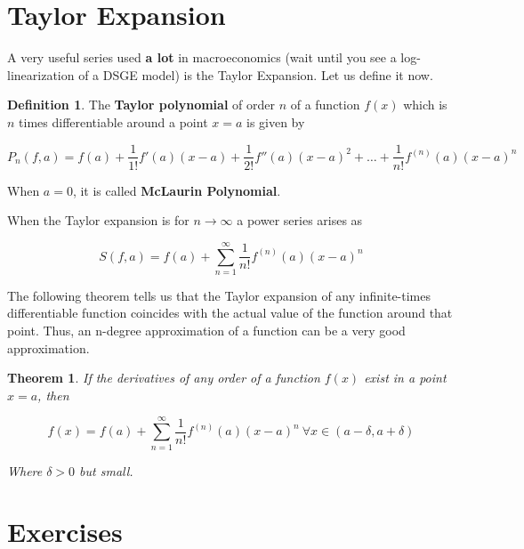 \documentclass[a4paper,11pt]{article}
\theoremstyle{definition}
\newtheorem{definition}{Definition}
\theoremstyle{plain}
\newtheorem{theorem}{Theorem}
\begin{document}
\section{Taylor Expansion}\label{taylor-expansion}

A very useful series used \textbf{a lot} in macroeconomics (wait until you see a log-linearization of a DSGE model) is the Taylor Expansion. Let us define it now.

\begin{definition}
The \textbf{Taylor polynomial} of order \(n\) of a function \(f(x)\) which is \(n\) times differentiable around a point
\(x = a\) is given by

\[
P_n\left(f,a\right) = f(a) + \frac{1}{1!}f'(a)(x-a) + \frac{1}{2!} f''(a)(x-a)^2+\ldots+\frac{1}{n!}f^{(n)}(a)(x-a)^n
\]

When \(a = 0\), it is called \textbf{McLaurin Polynomial}.
\end{definition}

When the Taylor expansion is for \(n\rightarrow\infty\) a power series arises as

\[
S\left(f,a\right) = f(a) + \sum^{\infty}_{n=1} \frac{1}{n!}f^{(n)}(a)(x-a)^n
\]

The following theorem tells us that the Taylor expansion of any infinite-times differentiable function coincides with the actual value of the function around that point. Thus, an n-degree approximation of a function can be a very good approximation.

\begin{theorem}
If the derivatives of any order of a function \(f(x)\) exist in a point \(x = a\), then

\[
f(x) = f(a) + \sum^{\infty}_{n=1} \frac{1}{n!}f^{(n)}(a)(x-a)^n \ \forall x\in(a-\delta,a+\delta)
\]

Where \(\delta>0\) but small.
\end{theorem}


\section{Exercises}\label{exercises}
\end{document}
